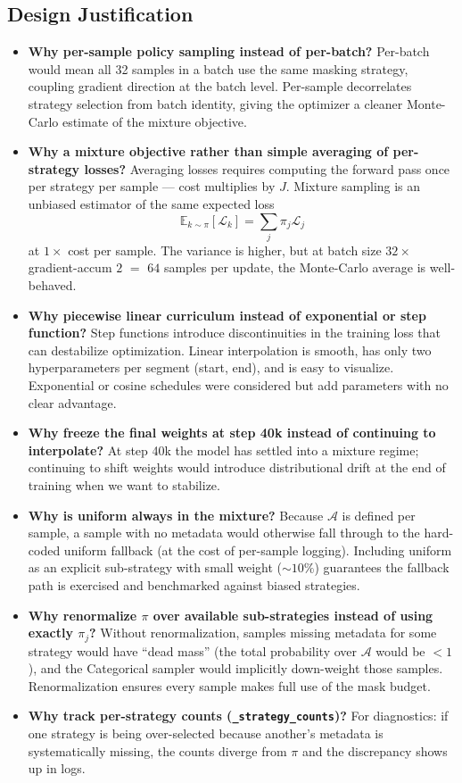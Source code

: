 \documentclass[11pt]{article}
\newcommand{\E}{\mathbb{E}}
\begin{document}
\subsection{Design Justification}
\begin{itemize}
\item \textbf{Why per-sample policy sampling instead of per-batch?}
Per-batch would mean all 32 samples in a batch use the same masking
strategy, coupling gradient direction at the batch level. Per-sample
decorrelates strategy selection from batch identity, giving the
optimizer a cleaner Monte-Carlo estimate of the mixture objective.
\item \textbf{Why a mixture objective rather than simple averaging of
per-strategy losses?} Averaging losses requires computing the forward
pass once per strategy per sample --- cost multiplies by $J$. Mixture
sampling is an unbiased estimator of the same expected loss
\begin{equation}
\E_{k \sim \pi}[\mathcal{L}_k] = \sum_j \pi_j \mathcal{L}_j
\end{equation}
at $1\times$ cost per sample. The variance is higher, but at batch
size $32 \times$ gradient-accum $2$ $=$ $64$ samples per update,
the Monte-Carlo average is well-behaved.
\item \textbf{Why piecewise linear curriculum instead of exponential or
step function?} Step functions introduce discontinuities in the
training loss that can destabilize optimization. Linear interpolation
is smooth, has only two hyperparameters per segment (start, end), and
is easy to visualize. Exponential or cosine schedules were considered
but add parameters with no clear advantage.
\item \textbf{Why freeze the final weights at step 40k instead of
continuing to interpolate?} At step 40k the model has settled into a
mixture regime; continuing to shift weights would introduce
distributional drift at the end of training when we want to stabilize.
\item \textbf{Why is uniform always in the mixture?} Because
$\mathcal{A}$ is defined per sample, a sample with no metadata would
otherwise fall through to the hard-coded uniform fallback (at the
cost of per-sample logging). Including uniform as an explicit
sub-strategy with small weight ($\sim 10\%$) guarantees the fallback
path is exercised and benchmarked against biased strategies.
\item \textbf{Why renormalize $\pi$ over available sub-strategies
instead of using exactly $\pi_j$?} Without renormalization, samples
missing metadata for some strategy would have ``dead mass'' (the
total probability over $\mathcal{A}$ would be $< 1$), and the
Categorical sampler would implicitly down-weight those samples.
Renormalization ensures every sample makes full use of the mask
budget.
\item \textbf{Why track per-strategy counts
(\texttt{\_strategy\_counts})?} For diagnostics: if one strategy is
being over-selected because another's metadata is systematically
missing, the counts diverge from $\pi$ and the discrepancy shows up
in logs.
\end{itemize}
\end{document}
